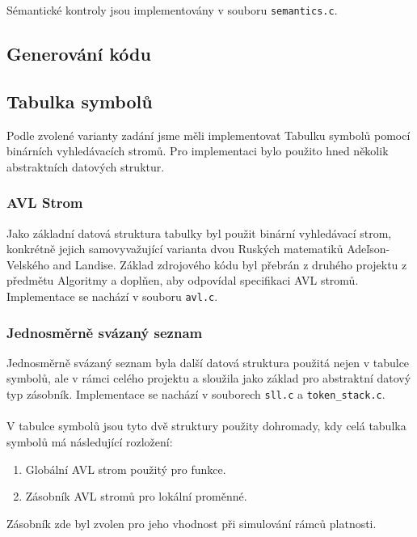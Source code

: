 \documentclass[a4paper]{article}
\theoremstyle{definition}
\begin{document}
Sémantické kontroly jsou implementovány v souboru \texttt{semantics.c}.

\subsection{Generování kódu}%

\subsection{Tabulka symbolů}\label{sec_symtable}
Podle zvolené varianty zadání jsme měli implementovat Tabulku symbolů pomocí binárních vyhledávacích stromů.
Pro implementaci bylo použito hned několik abstraktních datových struktur.

\subsubsection{AVL Strom}
Jako základní datová struktura tabulky byl použit binární vyhledávací strom, konkrétně jejich samovyvažující varianta dvou Ruských matematiků Adeľson-Velského and Landise. Základ zdrojového kódu byl přebrán z druhého projektu z předmětu Algoritmy a doplňen, aby odpovídal specifikaci AVL stromů. Implementace se nachází v souboru \texttt{avl.c}.

\subsubsection{Jednosměrně svázaný seznam}
Jednosměrně svázaný seznam byla další datová struktura použitá nejen v tabulce symbolů, ale v rámci celého projektu
a sloužila jako základ pro abstraktní datový typ zásobník\label{tstack}. Implementace se nachází v souborech \texttt{sll.c} a \texttt{token\_stack.c}.
\\ \\
V tabulce symbolů jsou tyto dvě struktury použity dohromady, kdy celá tabulka symbolů má následující rozložení:
\begin{enumerate}
    \item Globální AVL strom použitý pro funkce.
    \item Zásobník AVL stromů pro lokální proměnné.
\end{enumerate}

Zásobník zde byl zvolen pro jeho vhodnost při simulování rámců platnosti.
\end{document}
